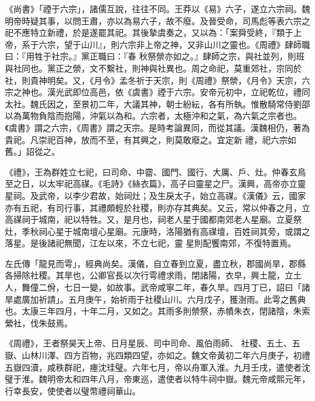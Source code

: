 \begin{pinyinscope}
 《尚書》「禋于六宗」，諸儒互說，往往不同。王莽以《易》六子，遂立六宗祠。魏明帝時疑其事，以問王肅，亦以為易六子，故不廢。及晉受命，司馬彪等表六宗之祀不應特立新禮，於是遂罷其祀。其後摯虞奏之，又以為：「案舜受終，『類于上帝，系于六宗，望于山川』，則六宗非上帝之神，又非山川之靈也。《周禮》肆師職曰：『用牲于社宗。』黨正職曰：『春
 秋祭禜亦如之。』肆師之宗，與社並列，則班與社同也。黨正之禜，文不繫社，則神與社異也。周之命祀，莫重郊社，宗同於社，則貴神明矣。又，《月令》孟冬祈于天宗，則《周禮》祭禜，《月令》天宗，六宗之神也。漢光武即位高邑，依《虞書》禋于六宗。安帝元初中，立祀乾位，禮同太社。魏氏因之，至景初二年，大議其神，朝士紛紜，各有所執。惟散騎常侍劉邵以為萬物負陰而抱陽，沖氣以為和。六宗者，太極沖和之氣，為六氣之宗者也。《虞書》謂之六宗，《周書》謂之天宗。是時考論異同，而從其議。漢魏相仍，著為貴祀。凡崇祀百神，放而不至，有其興之，則莫敢廢之。宜定新
 禮，祀六宗如舊。」詔從之。



 《禮》，王為群姓立七祀，曰司命、中霤、國門、國行、大厲、戶、灶。仲春玄鳥至之日，以太牢祀高禖。《毛詩》《絲衣篇》，高子曰靈星之尸。漢興，高帝亦立靈星祠。及武帝，以李少君故，始祠灶；及生戾太子，始立高禖。《漢儀》云，國家亦有五祀，有司行事，其禮頗輕於社稷，則亦存其典矣。又云，常以仲春之月，立高禖祠于城南，祀以特牲。又，是月也，祠老人星于國都南郊老人星廟。立夏祭灶，季秋祠心星于城南壇心星廟。元康時，洛陽猶有高禖壇，百姓祠其旁，或謂之落星。是後諸祀無聞，江左以來，不立七祀，靈
 星則配饗南郊，不復特置焉。



 左氏傳「龍見而雩」，經典尚矣。漢儀，自立春到立夏，盡立秋，郡國尚旱，郡縣各掃除社稷。其旱也，公卿官長以次行雩禮求雨，閉諸陽，衣皁，興土龍，立土人，舞僮二佾，七日一變，如故事。武帝咸寧二年，春久旱。四月丁已，詔曰「諸旱處廣加祈請」。五月庚午，始祈雨于社稷山川。六月戊子，獲澍雨。此雩之舊典也。太康三年四月，十年二月，又如之。其雨多則禜祭，赤幘朱衣，閉諸陰，朱索縈社，伐朱鼓焉。



 《周禮》，王者祭昊天上帝、日月星辰、司中司命、風伯雨師、
 社稷、五土、五嶽、山林川澤、四方百物，兆四類四望，亦如之。魏文帝黃初二年六月庚子，初禮五嶽四瀆，咸秩群祀，瘞沈珪璧。六年七月，帝以舟軍入淮。九月壬戌，遣使者沈璧于淮。魏明帝太和四年八月，帝東巡，遣使者以特牛祠中嶽。魏元帝咸熙元年，行幸長安，使使者以璧幣禮祠華山。




\end{pinyinscope}
